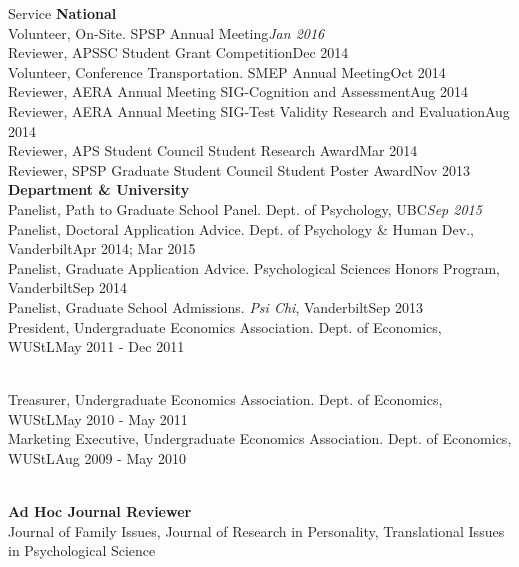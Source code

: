 \documentclass {resume}
\begin{document}
\begin{rSection}{\textrm{Service}}
{\large \textbf{National}}\\
Volunteer, On-Site. SPSP Annual Meeting\hfill{\textit{Jan 2016}}\smallskip\\
Reviewer, APSSC Student Grant Competition\hfill{Dec 2014}\smallskip\\
Volunteer, Conference Transportation. SMEP Annual Meeting\hfill{Oct 2014}\smallskip\\
Reviewer, AERA Annual Meeting SIG-Cognition and Assessment\hfill{Aug 2014}\smallskip\\%
Reviewer, AERA Annual Meeting SIG-Test Validity Research and Evaluation\hfill{Aug 2014}\smallskip\\
Reviewer, APS Student Council Student Research Award\hfill{Mar 2014}\smallskip\\
Reviewer, SPSP Graduate Student Council Student Poster Award\hfill{Nov 2013}\medskip\\
{\large \textbf{Department \& University}}\\
Panelist, Path to Graduate School Panel. Dept. of Psychology, UBC\hfill {\textit{Sep 2015}}\smallskip\\
Panelist, Doctoral Application Advice. Dept. of Psychology \& Human Dev., Vanderbilt\hfill {Apr 2014; Mar 2015}\smallskip\\
Panelist, Graduate Application Advice. Psychological Sciences Honors Program, Vanderbilt\hfill {Sep 2014}\smallskip\\
Panelist, Graduate School Admissions. \textit{Psi Chi}, Vanderbilt\hfill {Sep 2013}\smallskip\\
President, Undergraduate Economics Association. Dept. of Economics, WUStL\hfill  {May 2011 - Dec 2011}\vspace*{2pt}
\begin{minipage}{\linewidth}\smallskip\\Treasurer, Undergraduate Economics Association. Dept. of Economics, WUStL\hfill{May 2010 - May 2011}\smallskip\\
Marketing Executive, Undergraduate Economics Association. Dept. of Economics, WUStL\hfill  {Aug 2009 - May 2010}\end{minipage}\medskip\\
{\large \textbf{Ad Hoc Journal Reviewer}}\\
Journal of Family Issues, %
Journal of Research in Personality, %
Translational Issues in Psychological Science%
\end{rSection}
\end{document}
